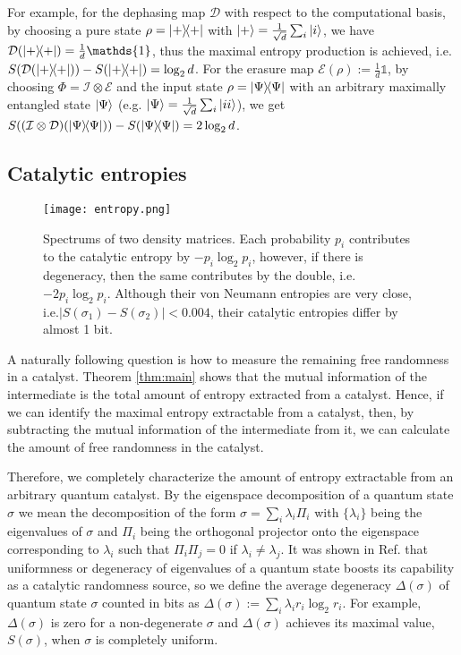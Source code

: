 \documentclass[aps, reprint, amsmath,amssymb, prx, superscriptaddress]{revtex4-2}
\begin{document}
     For example, for the dephasing map $\mathcal{D}$ with respect to the computational basis, by choosing a pure state $\rho=\dyad{+}$ with $\ket{+}=\frac{1}{\sqrt{d}}\sum_i \ket{i}$, we have $\mathcal{D}(\dyad{+})=\frac{1}{d}\mathds{1}$, thus the maximal entropy production is achieved, i.e. $ S(\mathcal{D}(\dyad{+}))-S(\dyad{+})=\log_2  d$. For the erasure map $\mathcal{E}(\rho):=\frac{1}{d}\mathds{1}$, by choosing $\Phi=\mathcal{I}\otimes\mathcal{E}$ and the input state $\rho=\dyad{\Psi}$ with an arbitrary maximally entangled state $\ket{\Psi}$ (e.g. $\ket{\Psi}=\frac{1}{\sqrt{d}}\sum_i \ket{ii}$), we get $ S((\mathcal{I}\otimes\mathcal{D})(\dyad{\Psi}))-S(\dyad{\Psi})  = 2\log_2  d$.

\subsection{Catalytic entropies} \label{subsec:catent}

\begin{figure}[t]
    \texttt{[image: entropy.png]}\label{fig:entropy}
    \caption{Spectrums of two density matrices. Each probability $p_i$ contributes to the catalytic entropy by $-p_i\log_2  p_i$, however, if there is degeneracy, then the same contributes by the double, i.e. $-2p_i\log_2p_i$. Although their von Neumann entropies are very close, i.e.$|S(\sigma_1)-S(\sigma_2)|<0.004$, their catalytic entropies differ by almost 1 bit.}
\end{figure}

A naturally following question is how to measure the remaining free randomness in a catalyst. Theorem \ref{thm:main} shows that the mutual information of the intermediate is the total amount of entropy extracted from a catalyst. Hence, if we can identify the maximal entropy extractable from a catalyst, then, by subtracting the mutual information of the intermediate from it, we can calculate the amount of free randomness in the catalyst.
 
Therefore, we completely characterize the amount of entropy extractable from an arbitrary quantum catalyst. By the eigenspace decomposition of a quantum state $\sigma$ we mean the decomposition of the form $\sigma=\sum_i \lambda_i \Pi_i$ with $\{\lambda_i\}$ being the eigenvalues of $\sigma$ and $\Pi_i$ being the orthogonal projector onto the eigenspace corresponding to $\lambda_i$ such that $\Pi_i\Pi_j=0$ if $\lambda_i\neq \lambda_j$. It was shown in Ref. \cite{lie2020uniform} that uniformness or degeneracy of eigenvalues of a quantum state boosts its capability as a catalytic randomness source, so we define the average degeneracy $\Delta(\sigma)$ of quantum state $\sigma$ counted in bits as $\Delta(\sigma) := \sum_i \lambda_i r_i \log_2  r_i$. For example, $\Delta(\sigma)$ is zero for a non-degenerate $\sigma$ and $\Delta(\sigma)$ achieves its maximal value, $S(\sigma)$, when $\sigma$ is completely uniform.
\end{document}
